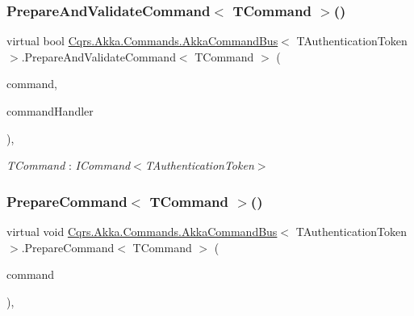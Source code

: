 \subsubsection{\texorpdfstring{Prepare\+And\+Validate\+Command$<$ T\+Command $>$()}{PrepareAndValidateCommand< TCommand >()}}
{\footnotesize\ttfamily virtual bool \hyperlink{classCqrs_1_1Akka_1_1Commands_1_1AkkaCommandBus}{Cqrs.\+Akka.\+Commands.\+Akka\+Command\+Bus}$<$ T\+Authentication\+Token $>$.Prepare\+And\+Validate\+Command$<$ T\+Command $>$ (\begin{DoxyParamCaption}\item[{T\+Command}]{command,  }\item[{out \hyperlink{classCqrs_1_1Bus_1_1RouteHandlerDelegate}{Route\+Handler\+Delegate}}]{command\+Handler }\end{DoxyParamCaption})\hspace{0.3cm}{\ttfamily [protected]}, {\ttfamily [virtual]}}

\begin{Desc}
\item[Type Constraints]\begin{description}
\item[{\em T\+Command} : {\em I\+Command$<$T\+Authentication\+Token$>$}]\end{description}
\end{Desc}
\mbox{\label{classCqrs_1_1Akka_1_1Commands_1_1AkkaCommandBus_a9755a84c0b971ce0862abdc2783422ce_a9755a84c0b971ce0862abdc2783422ce}} 
\subsubsection{\texorpdfstring{Prepare\+Command$<$ T\+Command $>$()}{PrepareCommand< TCommand >()}}
{\footnotesize\ttfamily virtual void \hyperlink{classCqrs_1_1Akka_1_1Commands_1_1AkkaCommandBus}{Cqrs.\+Akka.\+Commands.\+Akka\+Command\+Bus}$<$ T\+Authentication\+Token $>$.Prepare\+Command$<$ T\+Command $>$ (\begin{DoxyParamCaption}\item[{T\+Command}]{command }\end{DoxyParamCaption})\hspace{0.3cm}{\ttfamily [protected]}, {\ttfamily [virtual]}}

